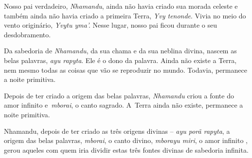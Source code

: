 
 

Nosso pai verdadeiro, \emph{Nhamandu}, ainda não havia criado sua morada
celeste e também ainda não havia criado a primeira Terra, \emph{Yvy
tenonde}. Vivia no meio do vento originário, \emph{Yvytu yma'.} Nesse
lugar, nosso pai ficou durante o seu desdobramento.

Da sabedoria de \emph{Nhamandu}, da sua chama e da sua neblina divina,
nascem as belas palavras, \emph{ayu rapyta}. Ele é o dono da palavra.
Ainda não existe a Terra, nem mesmo todas as coisas que vão se
reproduzir no mundo. Todavia, permanece a noite primitiva.

Depois de ter criado a origem das belas palavras, \emph{Nhamandu} criou
a fonte do amor infinito e~\emph{mborai}, o canto sagrado. A~Terra ainda
não existe, permanece a noite primitiva.

Nhamandu, depois de ter criado as três origens divinas -- \emph{ayu porã
rapyta}, a origem das belas palavras, \emph{mborai}, o canto divino,
\emph{mborayu miri}, o amor infinito , gerou aqueles com quem iria
dividir estas três fontes divinas de sabedoria infinita.
